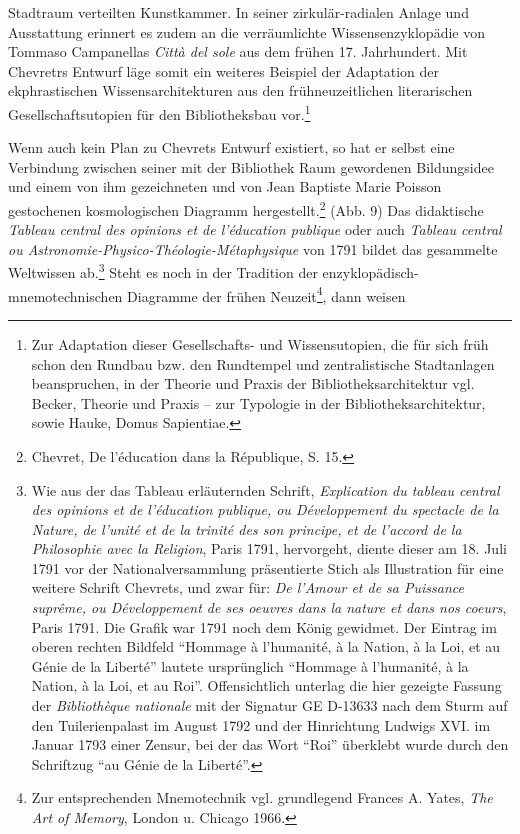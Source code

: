 Stadtraum verteilten Kunstkammer. In seiner zirkulär-radialen Anlage und
Ausstattung erinnert es zudem an die verräumlichte Wissensenzyklopädie
von Tommaso Campanellas \emph{Città del sole} aus dem frühen 17.
Jahrhundert. Mit Chevretrs Entwurf läge somit ein weiteres Beispiel der
Adaptation der ekphrastischen Wissensarchitekturen aus den
frühneuzeitlichen literarischen Gesellschaftsutopien für den
Bibliotheksbau vor.\footnote{Zur Adaptation dieser Gesellschafts- und
  Wissensutopien, die für sich früh schon den Rundbau bzw. den
  Rundtempel und zentralistische Stadtanlagen beanspruchen, in der
  Theorie und Praxis der Bibliotheksarchitektur vgl. Becker, Theorie und
  Praxis -- zur Typologie in der Bibliotheksarchitektur, sowie Hauke,
  Domus Sapientiae.}

Wenn auch kein Plan zu Chevrets Entwurf existiert, so hat er selbst eine
Verbindung zwischen seiner mit der Bibliothek Raum gewordenen
Bildungsidee und einem von ihm gezeichneten und von Jean Baptiste Marie
Poisson gestochenen kosmologischen Diagramm hergestellt.\footnote{Chevret,
  De l'éducation dans la République, S. 15.} (Abb. 9) Das didaktische
\emph{Tableau central des opinions et de l'éducation publique} oder auch
\emph{Tableau central ou Astronomie-Physico-Théologie-Métaphysique} von
1791 bildet das gesammelte Weltwissen ab.\footnote{Wie aus der das
  Tableau erläuternden Schrift, \emph{Explication du tableau central des
  opinions et de l'éducation publique, ou Développement du spectacle de
  la Nature, de l'unité et de la trinité des son principe, et de
  l'accord de la Philosophie avec la Religion}, Paris 1791, hervorgeht,
  diente dieser am 18. Juli 1791 vor der Nationalversammlung
  präsentierte Stich als Illustration für eine weitere Schrift Chevrets,
  und zwar für: \emph{De l'Amour et de sa Puissance suprême, ou
  Développement de ses oeuvres dans la nature et dans nos coeurs}, Paris
  1791. Die Grafik war 1791 noch dem König gewidmet. Der Eintrag im
  oberen rechten Bildfeld \enquote{Hommage à l'humanité, à la Nation, à
  la Loi, et au Génie de la Liberté} lautete ursprünglich
  \enquote{Hommage à l'humanité, à la Nation, à la Loi, et au Roi}.
  Offensichtlich unterlag die hier gezeigte Fassung der
  \emph{Bibliothèque nationale} mit der Signatur GE D-13633 nach dem
  Sturm auf den Tuilerienpalast im August 1792 und der Hinrichtung
  Ludwigs XVI. im Januar 1793 einer Zensur, bei der das Wort
  \enquote{Roi} überklebt wurde durch den Schriftzug \enquote{au Génie
  de la Liberté}.} Steht es noch in der Tradition der
enzyklopädisch-mnemotechnischen Diagramme der frühen Neuzeit\footnote{Zur
  entsprechenden Mnemotechnik vgl. grundlegend Frances A. Yates,
  \emph{The Art of Memory}, London u. Chicago 1966.}, dann weisen
